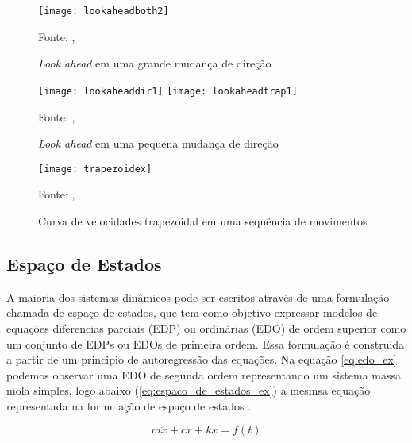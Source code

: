 \begin{figure}[!htb]
    \centering
    \caption{\textit{Look ahead} em uma grande mudança de direção}
    \texttt{[image: lookaheadboth2]}

    {\footnotesize Fonte: \citeauthor{klipperkinematic}, \citeyear{klipperkinematic}}
    \label{fig:lookahead_big}
\end{figure}

\begin{figure}[!htb]
    \centering
    \caption{\textit{Look ahead} em uma pequena mudança de direção}
    \texttt{[image: lookaheaddir1]}
    \texttt{[image: lookaheadtrap1]}

    {\footnotesize Fonte: \citeauthor{klipperkinematic}, \citeyear{klipperkinematic}}
    \label{fig:lookahead_small}
\end{figure}


\begin{figure}[!htb]
    \centering
    \caption{Curva de velocidades trapezoidal em uma sequência de movimentos}
    \texttt{[image: trapezoidex]}

    {\footnotesize Fonte: \citeauthor{klipperkinematic}, \citeyear{klipperkinematic}}
    \label{fig:trapezoidal}
\end{figure}


\subsection{Espaço de Estados}

A maioria dos sistemas dinâmicos pode ser escritos através de uma formulação
chamada de espaço de estados, que tem como objetivo expressar modelos 
de equações diferencias parciais (EDP) ou ordinárias (EDO) de ordem superior
como um conjunto de EDPs ou EDOs de primeira ordem.
Essa formulação é construida a partir de um principio de autoregressão
das equações. Na equação \ref{eq:edo_ex} podemos observar uma EDO de segunda ordem representando
um sistema massa mola simples,
logo abaixo (\ref{eq:espaco_de_estados_ex}) a mesmsa equação representada na formulação
de espaço de estados \cite{hamilton94}.

\begin{equation}
    \label{eq:edo_ex}
    m \ddot x+c \dot x+kx = f(t)
\end{equation}

